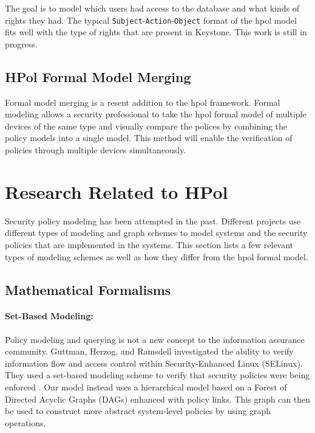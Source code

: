 \documentclass[12pt,letterpaper]{report}
\begin{document}
The goal is to model which users had access to the database and what kinds of rights they had. The typical \texttt{Subject}-\texttt{Action}-\texttt{Object} format of the \ac{hpol} model fits well with the type of rights that are present in Keystone. This work is still in progress.

\subsection{HPol Formal Model Merging}	
Formal model merging is a resent addition to the \ac{hpol} framework. Formal modeling allows a security professional to take the \ac{hpol} formal model of multiple devices of the same type and visually compare the polices by combining the policy models into a single model. This method will enable the verification of policies through multiple devices simultaneously.


\section{Research Related to HPol}
Security policy modeling has been attempted in the past. Different projects use different types of modeling and graph schemes to model systems and the security policies that are implemented in the systems. This section lists a few relevant types of modeling schemes as well as how they differ from the \ac{hpol} formal model.

\subsection{Mathematical Formalisms}
\paragraph{Set-Based Modeling:}Policy modeling and querying is not a new concept to the information assurance community. Guttman, Herzog, and Ramsdell investigated the ability to verify information flow and access control within Security-Enhanced Linux (SELinux). They used a set-based modeling scheme to verify that security policies were being enforced \cite{guttman2005selinux}. Our model instead uses a hierarchical model based on a Forest of Directed Acyclic Graphs (DAGs) enhanced with policy links. This graph can then be used to construct more abstract system-level policies by using graph operations.
\end{document}
